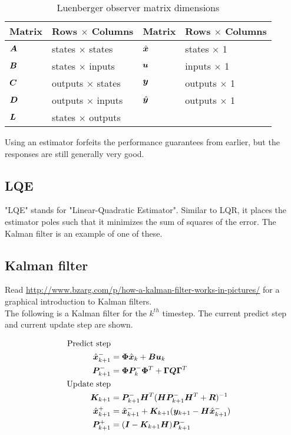 \begin{table}
  \caption{Luenberger observer matrix dimensions}
  \renewcommand{\arraystretch}{1.5}
  \centering
  \begin{tabular}{|ll|ll|}
    \hline
    \rowcolor{lightblue}
    \textbf{Matrix} & \textbf{Rows $\times$ Columns} &
    \textbf{Matrix} & \textbf{Rows $\times$ Columns} \\
    \hline
    $\bm A$ & states $\times$ states & $\hat{\bm x}$ & states $\times$ 1 \\
    $\bm B$ & states $\times$ inputs & $\bm u$ & inputs $\times$ 1 \\
    $\bm C$ & outputs $\times$ states & $\bm y$ & outputs $\times$ 1 \\
    $\bm D$ & outputs $\times$ inputs & $\hat{\bm y}$ & outputs $\times$ 1 \\
    $\bm L$ & states $\times$ outputs &  &  \\
    \hline
  \end{tabular}
  \label{tab:luenberger_matrix_dims}
\end{table}

Using an estimator forfeits the performance guarantees from earlier, but the
responses are still generally very good.

\subsection{LQE}

"LQE" stands for "Linear-Quadratic Estimator". Similar to LQR, it places the
estimator poles such that it minimizes the sum of squares of the error. The
Kalman filter is an example of one of these.

\subsection{Kalman filter}

Read \url{http://www.bzarg.com/p/how-a-kalman-filter-works-in-pictures/} for a
graphical introduction to Kalman filters. \\

The following is a Kalman filter for the $k^{th}$ timestep. The current predict
step and current update step are shown.

\begin{align}
  \text{Predict step} \nonumber \\
  \hat{\mtx{x}}_{k+1}^- &= \mtx{\Phi}\hat{\mtx{x}}_k + \mtx{B} \mtx{u}_k
    \label{eq:pre1_x} \\
  \mtx{P}_{k+1}^- &= \mtx{\Phi} \mtx{P}_k^- \mtx{\Phi}^T +
    \mtx{\Gamma}\mtx{Q}\mtx{\Gamma}^T \\
  \text{Update step} \nonumber \\
  \mtx{K}_{k+1} &= \mtx{P}_{k+1}^- \mtx{H}^T (\mtx{H}\mtx{P}_{k+1}^- \mtx{H}^T +
    \mtx{R})^{-1} \\
  \hat{\mtx{x}}_{k+1}^+ &= \hat{\mtx{x}}_{k+1}^- + \mtx{K}_{k+1}(\mtx{y}_{k+1} -
    \mtx{H} \hat{\mtx{x}}_{k+1}^-) \label{eq:post1_x} \\
  \mtx{P}_{k+1}^+ &= (\mtx{I} - \mtx{K}_{k+1}\mtx{H})\mtx{P}_{k+1}^-
\end{align}


